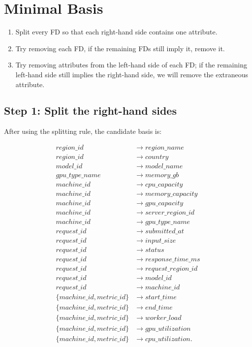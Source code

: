 \documentclass[11pt]{article}
\newcommand{\fd}{\rightarrow}
\begin{document}
\section{Minimal Basis}
\begin{enumerate}
    \item Split every FD so that each right-hand side contains one attribute.
    \item Try removing each FD, if the remaining FDs still imply it, remove it.
    \item Try removing attributes from the left-hand side of each FD; if the remaining left-hand side still implies the right-hand side, we will remove the extraneous attribute.
\end{enumerate}

\subsection{Step 1: Split the right-hand sides}

After using the splitting rule, the candidate basis is:

\begin{align*}
region\_id &\fd region\_name\\
region\_id &\fd country\\
model\_id &\fd model\_name\\
gpu\_type\_name &\fd memory\_gb\\
machine\_id &\fd cpu\_capacity\\
machine\_id &\fd memory\_capacity\\
machine\_id &\fd gpu\_capacity\\
machine\_id &\fd server\_region\_id\\
machine\_id &\fd gpu\_type\_name\\
request\_id &\fd submitted\_at\\
request\_id &\fd input\_size\\
request\_id &\fd status\\
request\_id &\fd response\_time\_ms\\
request\_id &\fd request\_region\_id\\
request\_id &\fd model\_id\\
request\_id &\fd machine\_id\\
\{machine\_id, metric\_id\} &\fd start\_time\\
\{machine\_id, metric\_id\} &\fd end\_time\\
\{machine\_id, metric\_id\} &\fd worker\_load\\
\{machine\_id, metric\_id\} &\fd gpu\_utilization\\
\{machine\_id, metric\_id\} &\fd cpu\_utilization.
\end{align*}
\end{document}
